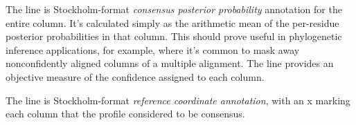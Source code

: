 The  line is Stockholm-format \emph{consensus
posterior probability} annotation for the entire column. It's
calculated simply as the arithmetic mean of the per-residue posterior
probabilities in that column. This should prove useful in phylogenetic
inference applications, for example, where it's common to mask away
nonconfidently aligned columns of a multiple alignment. The
 line provides an objective measure of the confidence
assigned to each column.

The  line is Stockholm-format \emph{reference
  coordinate annotation}, with an x marking each column that the
profile considered to be consensus.









